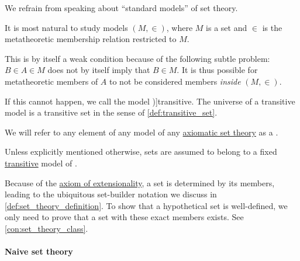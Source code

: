 \begin{definition}
\begin{thmenum}
    We refrain from speaking about \enquote{standard models} of set theory.

     It is most natural to study models \( (M, {\in}) \), where \( M \) is a set and \( {\in} \) is the metatheoretic membership relation restricted to \( M \).

    This is by itself a weak condition because of the following subtle problem: \( B \in A \in M \) does not by itself imply that \( B \in M \). It is thus possible for metatheoretic members of \( A \) to not be considered members \emph{inside} \( (M, {\in}) \).

    If this cannot happen, we call the model \term[ru=транзитивная (модель) (\cite[\S 4.7.2]{КусраевКутателадзе2005БулевозначныйАнализ})]{transitive}. The universe of a transitive model is a transitive set in the sense of \cref{def:transitive_set}.
  \end{thmenum}
\end{definition}

\begin{definition}\label{def:set}\mimprovised
  We will refer to any element of any model of any \hyperref[def:axiomatic_set_theory]{axiomatic set theory} as a .
\end{definition}
\begin{comments}
  \item Unless explicitly mentioned otherwise, sets are assumed to belong to a fixed \hyperref[def:set_theory_model/transitive]{transitive} model of \hyperref[def:axiom_of_universes]{}.

  \item Because of the \hyperref[def:axiomatic_set_theory/extensionality]{axiom of extensionality}, a set is determined by its members, leading to the ubiquitous set-builder notation we discuss in \cref{def:set_theory_definition}. To show that a hypothetical set is well-defined, we only need to prove that a set with these exact members exists. See \cref{con:set_theory_class}.
\end{comments}

\paragraph{Naive set theory}


